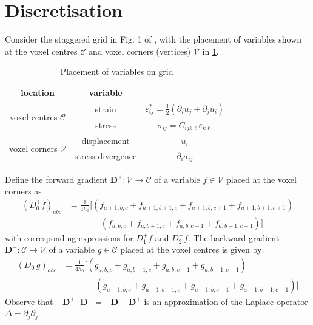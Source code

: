\documentclass[11pt]{article}
\renewcommand{\vec}[1]{\boldsymbol{#1}}
\begin{document}
\section{Discretisation}
Consider the staggered grid in Fig. 1 of \cite{gelebart2020modified}, with the placement of variables shown at the voxel centres $\mathcal{C}$ and voxel corners (vertices) $\mathcal{V}$ in \cref{tab:placement}.
\begin{table}
    \caption{Placement of variables on grid}\label{tab:placement}
    \begin{center}
\begin{tabular}{ccc}
    \hline
location & variable & \\
\hline\hline
\multirow{2}{*}{voxel centres $\mathcal{C}$} & strain & $\varepsilon^*_{ij}=\frac{1}{2}(\partial_i u_j + \partial_j u_i)$ \\
& stress & $\sigma_{ij}=C_{ijk\ell} \varepsilon_{k\ell}$ \\\hline
\multirow{2}{*}{voxel corners $\mathcal{V}$} & displacement & $u_i$ \\
& stress divergence & $\partial_i \sigma_{ij}$ \\
\hline
\end{tabular}
\end{center}
\end{table}
Define the forward gradient $\vec{D}^+:\mathcal{V}\rightarrow \mathcal{C}$ of a variable $f\in \mathcal{V}$ placed at the voxel corners as
\begin{equation}
    \begin{aligned}
(D_0^+ f)_{abc} &= \frac{1}{4h_0}\Big[\left(f_{a+1,b,c}+f_{a+1,b+1,c}+f_{a+1,b,c+1}+f_{a+1,b+1,c+1}\right)\\
& \qquad -\;\;\left(f_{a,b,c}+f_{a,b+1,c}+f_{a,b,c+1}+f_{a,b+1,c+1} \right)\Big]
    \end{aligned}
\end{equation}
with corresponding expressions for $D_1^+ f$ and $D_2^+ f$.
The backward gradient $\vec{D}^-:\mathcal{C}\rightarrow \mathcal{V}$ of a variable $g\in \mathcal{C}$ placed at the voxel centres is given by
\begin{equation}
    \begin{aligned}
(D_0^- g)_{abc} &= \frac{1}{4h_0}\Big[\left(g_{a,b,c}+g_{a,b-1,c}+g_{a,b,c-1}+g_{a,b-1,c-1}\right)\\
& \qquad -\;\;\left(g_{a-1,b,c}+g_{a-1,b-1,c}+g_{a-1,b,c-1}+g_{a-1,b-1,c-1} \right)\Big]
    \end{aligned}
\end{equation}
Observe that $-\vec{D}^+\cdot \vec{D}^- = -\vec{D}^-\cdot \vec{D}^+$ is an approximation of the Laplace operator $\Delta=\partial_j\partial_j$.
\end{document}
